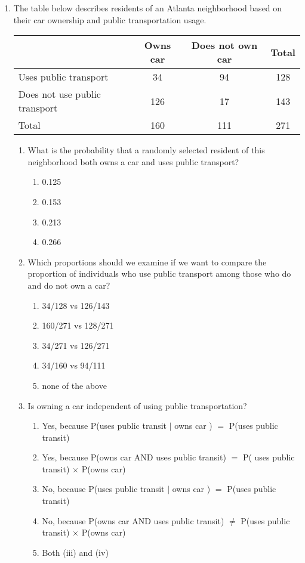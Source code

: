 \documentclass[11pt,fullpage]{amsart}
\begin{document}
\begin{enumerate}
\item The table below describes residents of an Atlanta neighborhood based on their car ownership and public transportation usage.
\begin{center}
\begin{tabular}{|l|cc|c|}
    \hline
                    & Owns car & Does not own car & Total \\
    \hline
    Uses public transport             & 34 & 94 & 128\\
    Does not use public transport     & 126 & 17 & 143\\
    \hline
    Total                             & 160 & 111 & 271\\
    \hline
\end{tabular}
\end{center}
\begin{enumerate}
\item
What is the probability that a randomly selected resident of this neighborhood both owns a car and uses public transport?
\begin{enumerate}
\item 0.125
\item 0.153
\item 0.213
\item 0.266
\end{enumerate}
\item
Which proportions should we examine if we want to compare the proportion of individuals who use public transport among those who do and do not own a car?
\begin{enumerate}
    \item
    34/128 vs 126/143
    \item
    160/271 vs 128/271
    \item
    34/271 vs 126/271
    \item
    34/160 vs 94/111
    \item
    none of the above
\end{enumerate}
\item
Is owning a car independent of using public transportation?
\begin{enumerate}
\item Yes, because P(uses public transit $|$ owns car ) $=$ P(uses public transit)
\item Yes, because P(owns car AND uses public transit) $=$ P( uses public transit) $\times$ P(owns car)
\item No, because P(uses public transit $|$ owns car ) $=$ P(uses public transit)
\item No, because P(owns car AND uses public transit) $\neq$ P(uses public transit) $\times$ P(owns car)
\item Both (iii) and (iv)
\end{enumerate}
\end{enumerate}


\end{enumerate}
\end{document}
